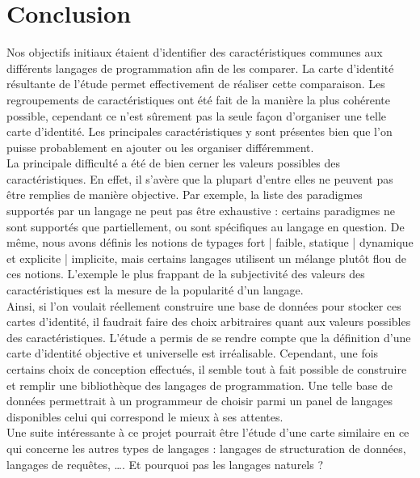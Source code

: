 \section{Conclusion}

Nos objectifs initiaux étaient d'identifier des caractéristiques communes aux différents langages de programmation afin de les comparer. La carte d'identité résultante de l'étude permet effectivement de réaliser cette comparaison. Les regroupements de caractéristiques ont été fait de la manière la plus cohérente possible, cependant ce n'est sûrement pas la seule façon d'organiser une telle carte d'identité. Les principales caractéristiques y sont présentes bien que l'on puisse probablement en ajouter ou les organiser différemment.\\

La principale difficulté a été de bien cerner les valeurs possibles des caractéristiques. En effet, il s'avère que la plupart d'entre elles ne peuvent pas être remplies de manière objective. Par exemple, la liste des paradigmes supportés par un langage ne peut pas être exhaustive : certains paradigmes ne sont supportés que partiellement, ou sont spécifiques au langage en question. De même, nous avons définis les notions de typages fort | faible, statique | dynamique et explicite | implicite, mais certains langages utilisent un mélange plutôt flou de ces notions. L'exemple le plus frappant de la subjectivité des valeurs des caractéristiques est la mesure de la popularité d'un langage.\\

Ainsi, si l'on voulait réellement construire une base de données pour stocker ces cartes d'identité, il faudrait faire des choix arbitraires quant aux valeurs possibles des caractéristiques. L'étude a permis de se rendre compte que la définition d'une carte d'identité objective et universelle est irréalisable. Cependant, une fois certains choix de conception effectués, il semble tout à fait possible de construire et remplir une bibliothèque des langages de programmation. Une telle base de données permettrait à un programmeur de choisir parmi un panel de langages disponibles celui qui correspond le mieux à ses attentes.\\

Une suite intéressante à ce projet pourrait être l'étude d'une carte similaire en ce qui concerne les autres types de langages : langages de structuration de données, langages de requêtes, …. Et pourquoi pas les langages naturels ?